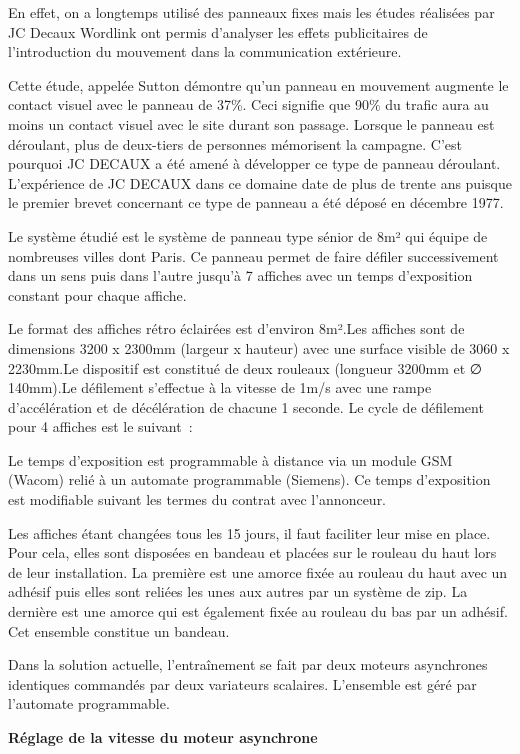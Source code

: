 En effet, on a longtemps utilisé des panneaux fixes mais les études réalisées par JC Decaux Wordlink ont permis d'analyser les effets publicitaires de l'introduction du mouvement dans la communication extérieure.

Cette étude, appelée Sutton démontre qu'un panneau en mouvement augmente le contact visuel avec le panneau de 37\%. Ceci signifie que 90\% du trafic aura au moins un contact visuel avec le site durant son passage. Lorsque le panneau est déroulant, plus de deux-tiers de personnes mémorisent la campagne. C'est pourquoi JC DECAUX a été amené à développer ce type de panneau déroulant. L'expérience de JC DECAUX dans ce domaine date de plus de trente ans puisque le premier brevet concernant ce type de panneau a été déposé en décembre 1977.

Le système étudié est le système de panneau type sénior de 8m² qui équipe de nombreuses villes dont Paris. Ce panneau permet de faire défiler successivement dans un sens puis dans l'autre jusqu'à 7 affiches avec un temps d'exposition constant pour chaque affiche.

Le format des affiches rétro éclairées est d'environ 8m².Les affiches sont de dimensions 3200 x 2300mm (largeur x hauteur) avec une surface visible de 3060 x 2230mm.Le dispositif est constitué de deux rouleaux (longueur 3200mm et ∅ 140mm).Le défilement s'effectue à la vitesse de 1m/s avec une rampe d'accélération et de décélération de chacune 1 seconde. Le cycle de défilement pour 4 affiches est le suivant~:

Le temps d'exposition est programmable à distance via un module GSM (Wacom) relié à un automate programmable (Siemens). Ce temps d'exposition est modifiable suivant les termes du contrat avec l'annonceur.

Les affiches étant changées tous les 15 jours, il faut faciliter leur mise en place. Pour cela, elles sont disposées en bandeau et placées sur le rouleau du haut lors de leur installation. La première est une amorce fixée au rouleau du haut avec un adhésif puis elles sont reliées les unes aux autres par un système de zip. La dernière est une amorce qui est également fixée au rouleau du bas par un adhésif. Cet ensemble constitue un bandeau.

Dans la solution actuelle, l'entraînement se fait par deux moteurs asynchrones identiques commandés par deux variateurs scalaires. L'ensemble est géré par l'automate programmable.

\textbf{Réglage de la vitesse du moteur asynchrone}

